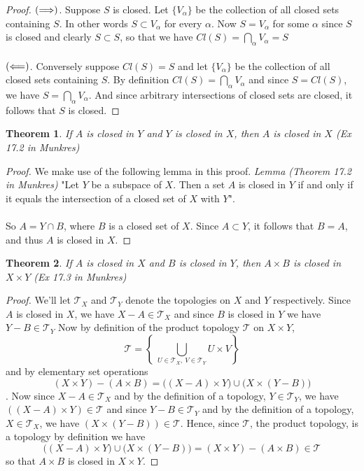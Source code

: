 \documentclass{article}
\newtheorem{theorem}{Theorem}[section]
\theoremstyle{remark}
\theoremstyle{definition}
\newcommand{\simplies}{\DOTSB\Longrightarrow}
\newcommand{\lsimplies}{\DOTSB\Longleftarrow}
\begin{document}
\begin{proof}[Proof]
$(\simplies)$. Suppose $S$ is closed. Let $\{V_{\alpha}\}$ be the collection of all closed sets containing $S$. In other words $S \subset V_{\alpha}$ for every $\alpha$. Now $S = V_{\alpha}$ for some $\alpha$ since $S$ is closed and clearly $S \subset S$, so that we have $Cl(S) = \bigcap_{\alpha}V_{\alpha} = S$
\\ \\ 
$(\lsimplies)$. Conversely suppose $Cl(S) = S$ and let $\{V_{\alpha}\}$ be the collection of all closed sets containing $S$. By definition $Cl(S) = \bigcap_{\alpha}V_{\alpha}$ and since $S = Cl(S)$, we have $S = \bigcap_{\alpha}V_{\alpha}$. And since arbitrary intersections of closed sets are closed, it follows that $S$ is closed.
\end{proof}
\medskip
\begin{theorem}
If $A$ is closed in $Y$ and $Y$ is closed in $X$, then $A$ is closed in $X$ (Ex 17.2 in Munkres)
\end{theorem}

\begin{proof}
We make use of the following lemma in this proof. 
\textit{Lemma (Theorem 17.2 in Munkres)} "Let $Y$ be a subspace of $X$. Then a set $A$ is closed in $Y$ if and only if it equals the intersection of a closed set of $X$ with $Y$".
\\ \\
So $A = Y \cap B$, where $B$ is a closed set of $X$. Since $A \subset Y$, it follows that $B = A$, and thus $A$ is closed in $X$.
\end{proof}
\medskip
\begin{theorem}
If $A$ is closed in $X$ and $B$ is closed in $Y$, then $A \times B$ is closed in $X \times Y$ (Ex 17.3 in Munkres)
\end{theorem}

\begin{proof}
We'll let $\mathcal{T}_X$ and $\mathcal{T}_Y$ denote the topologies on $X$ and $Y$ respectively. Since $A$ is closed in $X$, we have $X - A \in \mathcal{T}_X$ and since $B$ is closed in $Y$ we have $Y - B \in \mathcal{T}_Y$ Now by definition of the product topology $\mathcal{T}$ on $X \times Y$, $$\mathcal{T} = \left\{ \ \bigcup_{U \in \mathcal{T}_X, \ V \in \mathcal{T}_Y} U \times V \right\}$$ and by elementary set operations $$(X\times Y)-(A\times B)=\Big((X- A)\times Y\Big)\cup\Big(X\times(Y - B)\Big)$$.
Now since $X - A \in \mathcal{T}_X$ and by the definition of a topology, $Y \in \mathcal{T}_Y$, we have $\left((X- A)\times Y\right) \in \mathcal{T}$ and since $Y - B \in \mathcal{T}_Y$ and by the definition of a topology, $X \in \mathcal{T}_X$, we have $\left(X\times(Y - B)\right) \in \mathcal{T}$. Hence, since $\mathcal{T}$, the product topology, is a topology by definition we have$$\Big((X- A)\times Y\Big)\cup\Big(X\times(Y - B)\Big) = (X\times Y)-(A\times B) \in \mathcal{T}$$ so that $A \times B$ is closed in $X \times Y$.
\end{proof}
\end{document}
